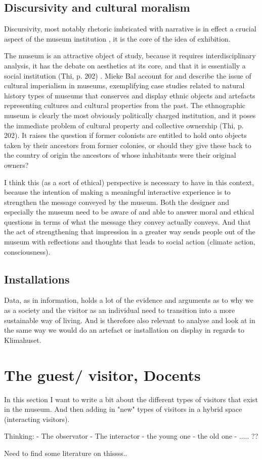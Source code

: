 \subsection{Discursivity and cultural moralism}
Discursivity, most notably rhetoric imbricated with narrative is in effect a crucial aspect of the museum institution \autocite[p. 205]{Thi_book}, it is the core of the idea of exhibition.

The museum is an attractive object of study, because it requires interdisciplinary analysis, it has the debate on aesthetics at its core, and that it is essentially a social institution (Thi, p. 202) \autocite[p. 202]{Miekebal_book}. Mieke Bal account for and describe the issue of cultural imperialism in museums, exemplifying case studies related to natural history types of museums that conserves and display ethnic objects and artefacts representing cultures and cultural properties from the past. The ethnographic museum is clearly the most obviously politically charged institution, and it poses the immediate problem of cultural property and collective ownership (Thi, p. 202). It raises the question if former colonists are entitled to hold onto objects taken by their ancestors from former colonies, or should they give these back to the country of origin the ancestors of whose inhabitants were their original owners?

I think this (as a sort of ethical) perspective is necessary to have in this context, because the intention of making a meaningful interactive experience is to strengthen the message conveyed by the museum. Both the designer and especially the museum need to be aware of and able to answer moral and ethical questions in terms of what the message they convey actually conveys. And that the act of strengthening that impression in a greater way sends people out of the museum with reflections and thoughts that leads to social action (climate action, consciousness). 




\subsection{Installations}
Data, as in information, holds a lot of the evidence and arguments as to why we as a society and the visitor as an individual need to transition into a more sustainable way of living. And is therefore also relevant to analyse and look at in the same way we would do an artefact or installation on display in regards to Klimahuset.



\section{The guest/ visitor, Docents}
In this section I want to write a bit about the different types of visitors that exist in the museum. And then adding in "new" types of visitors in a hybrid space (interacting visitors).

Thinking:
- The observator
- The interactor
- the young one
- the old one
- ..... ??

\par Need to find some literature on thissss..